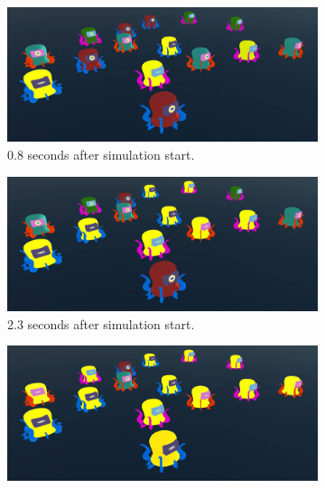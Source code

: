 \begin{figure}[!ht]
  \begin{subfigure}[b]{0.495\textwidth}
	\centering\captionsetup{width=.9\linewidth}%
	\includegraphics[width=\textwidth]{Assets/DocSegments/Chapters/Introduction/Figures/illustrative_system_result_figure_s0p8.png}
	\caption{0.8 seconds after simulation start.}
	\label{fig:sub:illustrative_developed_system_t1}
  \end{subfigure}
  \begin{subfigure}[b]{0.495\textwidth}
	\centering\captionsetup{width=.9\linewidth}%
	\includegraphics[width=\textwidth]{Assets/DocSegments/Chapters/Introduction/Figures/illustrative_system_result_figure_s2p3.png}
	\caption{2.3 seconds after simulation start.}
	\label{fig:sub:illustrative_developed_system_t2}
  \end{subfigure}
  \begin{subfigure}[b]{0.495\textwidth}
	\centering\captionsetup{width=.9\linewidth}%
	\includegraphics[width=\textwidth]{Assets/DocSegments/Chapters/Introduction/Figures/illustrative_system_result_figure_s6p2.png}

\end{subfigure}
\end{figure}
